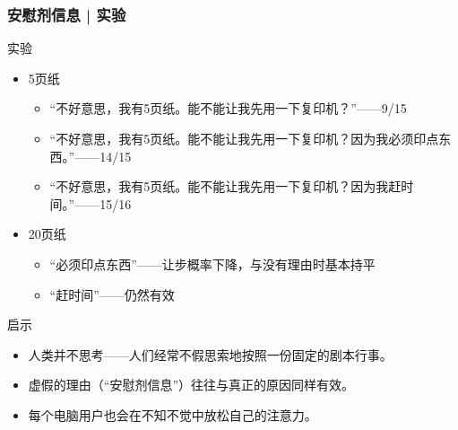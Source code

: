 \begin{frame}
  \frametitle{安慰剂信息 | 实验}
  \begin{block}{实验}
    \begin{itemize}
      \item 5页纸
    \begin{itemize}
      \item “不好意思，我有5页纸。能不能让我先用一下复印机？”——9/15
      \item “不好意思，我有5页纸。能不能让我先用一下复印机？因为我必须印点东西。”——14/15
      \item “不好意思，我有5页纸。能不能让我先用一下复印机？因为我赶时间。”——15/16
    \end{itemize}
      \item 20页纸
        \begin{itemize}
          \item “必须印点东西”——让步概率下降，与没有理由时基本持平
          \item “赶时间”——仍然有效
        \end{itemize}
    \end{itemize}
  \end{block}
  \pause
  \begin{block}{启示}
    \begin{itemize}
      \item 人类并不思考——人们经常不假思索地按照一份固定的剧本行事。
      \item 虚假的理由（“安慰剂信息”）往往与真正的原因同样有效。
      \item 每个电脑用户也会在不知不觉中放松自己的注意力。
    \end{itemize}
  \end{block}
\end{frame}

